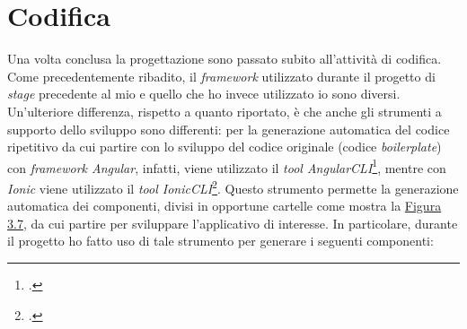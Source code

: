 
\section{Codifica}

Una volta conclusa la progettazione sono passato subito all'attività di codifica. Come precedentemente ribadito, il \textit{framework} utilizzato durante il progetto di \textit{stage} precedente al mio e quello che ho invece utilizzato io sono diversi. Un'ulteriore differenza, rispetto a quanto riportato, è che anche gli strumenti a supporto dello sviluppo sono differenti: per la generazione automatica del codice ripetitivo da cui partire con lo sviluppo del codice originale (codice \textit{boilerplate}) con \textit{framework Angular}, infatti, viene utilizzato il \textit{tool AngularCLI}\footcite{tec:angularcli}, mentre con \textit{Ionic} viene utilizzato il \textit{tool IonicCLI}\footcite{tec:ioniccli}. Questo strumento permette la generazione automatica dei componenti, divisi in opportune cartelle come mostra la \hyperref[img:directory]{Figura 3.7}, da cui partire per sviluppare l'applicativo di interesse. In particolare, durante il progetto ho fatto uso di tale strumento per generare i seguenti componenti:
